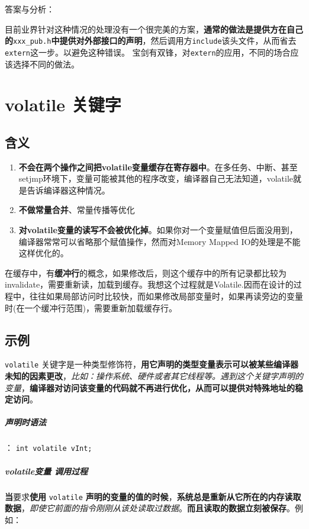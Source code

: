 \documentclass[UTF8,a4paper,12pt]{ctexbook} %
\begin{document}
	        答案与分析：
	        
	        目前业界针对这种情况的处理没有一个很完美的方案，\textbf{通常的做法是提供方在自己的}\verb|xxx_pub.h|\textbf{中提供对外部接口的声明}，然后调用方\verb|include|该头文件，从而省去\verb|extern|这一步。以避免这种错误。
	        宝剑有双锋，对\verb|extern|的应用，不同的场合应该选择不同的做法。
	      
\chapter{volatile 关键字}
	\section{含义}
		\begin{enumerate}
			\item \textbf{不会在两个操作之间把volatile变量缓存在寄存器中}。在多任务、中断、甚至setjmp环境下，变量可能被其他的程序改变，编译器自己无法知道，volatile就是告诉编译器这种情况。
			\item \textbf{不做常量合并}、常量传播等优化
			\item \textbf{对volatile变量的读写不会被优化掉}。如果你对一个变量赋值但后面没用到，编译器常常可以省略那个赋值操作，然而对Memory Mapped IO的处理是不能这样优化的。
		\end{enumerate}
	
	在缓存中，有\textbf{缓冲行}的概念，如果修改后，则这个缓存中的所有记录都比较为invalidate，需要重新读，加载到缓存。我想这个过程就是Volatile.因而在设计的过程中，往往如果局部访问时比较快，而如果修改局部变量时，如果再读旁边的变量时(在一个缓冲行范围)，需要重新加载缓存行。
	
	\section{示例}
		\verb|volatile| 关键字是一种类型修饰符，\textbf{用它声明的类型变量表示可以被某些编译器未知的因素更改}，\textit{比如：操作系统、硬件或者其它线程等。遇到这个关键字声明的变量}，\textbf{编译器对访问该变量的代码就不再进行优化，从而可以提供对特殊地址的稳定访问}。
		
		\paragraph{声明时语法}：
			\verb|int volatile vInt; | 
		
		\paragraph{volatile变量 调用过程}
			\textbf{当}要求\textbf{使用} \verb|volatile| \textbf{声明的变量的值的时候}，\textbf{系统总是重新从它所在的内存读取数据}，\textit{即使它前面的指令刚刚从该处读取过数据}。\textbf{而且读取的数据立刻被保存}。例如：
		
\end{document}
